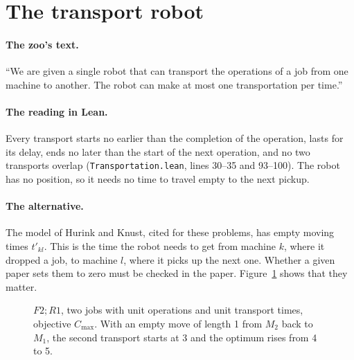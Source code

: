 \documentclass[11pt]{article}
\newcommand{\lean}[1]{\texttt{#1}}
\newcommand{\Cmax}{C_{\max}}
\theoremstyle{definition}
\newcommand{\gbar}[5]{\fill[#4] (#2,#1-0.35) rectangle (#3,#1+0.35);
  \draw (#2,#1-0.35) rectangle (#3,#1+0.35); \node at ({(#2+#3)/2},#1) {\small #5};}
\newcommand{\gaxis}[2]{\draw[->] (0,#1) -- (#2+0.4,#1);
  \foreach \t in {0,...,#2} \draw (\t,#1+0.08) -- (\t,#1-0.08) node[below] {\scriptsize \t};}
\begin{document}
\section{The transport robot}\label{sec:robot}

\paragraph{The zoo's text.} ``We are given a single robot that can transport
the operations of a job from one machine to another. The robot can make at
most one transportation per time.''

\paragraph{The reading in Lean.} Every transport starts no earlier than the
completion of the operation, lasts for its delay, ends no later than the start of
the next operation, and no two transports overlap (\lean{Transportation.lean},
lines 30--35 and 93--100). The robot has no position, so it needs no time to
travel empty to the next pickup.

\paragraph{The alternative.} The model of Hurink and Knust, cited for these
problems, has empty moving times $t'_{kl}$. This is the time the robot needs to get
from machine $k$, where it dropped a job, to machine $l$, where it picks up the
next one. Whether a given paper sets them to zero must be checked in the paper.
Figure~\ref{fig:robot} shows that they matter.

\begin{figure}[ht]
\centering
{}
\caption{$F2;R1$, two jobs with unit operations and unit transport times,
objective $\Cmax$. With an empty move of length 1 from $M_2$ back to $M_1$, the
second transport starts at 3 and the optimum rises from 4 to 5.}
\label{fig:robot}
\end{figure}
\end{document}
